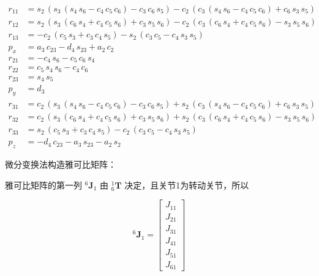 \documentclass{homework}
\begin{document}
\begin{sol}
\begin{align*} 
  r_{11} &= s_{2}\,\left(s_{3}\,\left(s_{4}\,s_{6}-c_{4}\,c_{5}\,c_{6}\right)-c_{3}\,c_{6}\,s_{5}\right)-c_{2}\,\left(c_{3}\,\left(s_{4}\,s_{6}-c_{4}\,c_{5}\,c_{6}\right)+c_{6}\,s_{3}\,s_{5}\right) \\ 
  r_{12} &= s_{2}\,\left(s_{3}\,\left(c_{6}\,s_{4}+c_{4}\,c_{5}\,s_{6}\right)+c_{3}\,s_{5}\,s_{6}\right)-c_{2}\,\left(c_{3}\,\left(c_{6}\,s_{4}+c_{4}\,c_{5}\,s_{6}\right)-s_{3}\,s_{5}\,s_{6}\right) \\ 
  r_{13} &= -c_{2}\,\left(c_{5}\,s_{3}+c_{3}\,c_{4}\,s_{5}\right)-s_{2}\,\left(c_{3}\,c_{5}-c_{4}\,s_{3}\,s_{5}\right) \\ 
  p_x &= a_{3}\,c_{23}-d_{4}\,s_{23}+a_{2}\,c_{2} \\ 
  r_{21} &= -c_{4}\,s_{6}-c_{5}\,c_{6}\,s_{4} \\ 
  r_{22} &= c_{5}\,s_{4}\,s_{6}-c_{4}\,c_{6} \\ 
  r_{23} &= s_{4}\,s_{5} \\ 
  p_y &= d_{3} \\ 
  r_{31} &= c_{2}\,\left(s_{3}\,\left(s_{4}\,s_{6}-c_{4}\,c_{5}\,c_{6}\right)-c_{3}\,c_{6}\,s_{5}\right)+s_{2}\,\left(c_{3}\,\left(s_{4}\,s_{6}-c_{4}\,c_{5}\,c_{6}\right)+c_{6}\,s_{3}\,s_{5}\right) \\ 
  r_{32} &= c_{2}\,\left(s_{3}\,\left(c_{6}\,s_{4}+c_{4}\,c_{5}\,s_{6}\right)+c_{3}\,s_{5}\,s_{6}\right)+s_{2}\,\left(c_{3}\,\left(c_{6}\,s_{4}+c_{4}\,c_{5}\,s_{6}\right)-s_{3}\,s_{5}\,s_{6}\right) \\ 
  r_{33} &= s_{2}\,\left(c_{5}\,s_{3}+c_{3}\,c_{4}\,s_{5}\right)-c_{2}\,\left(c_{3}\,c_{5}-c_{4}\,s_{3}\,s_{5}\right) \\ 
  p_z &= -d_{4}\,c_{23}-a_{3}\,s_{23}-a_{2}\,s_{2}
\end{align*}

微分变换法构造雅可比矩阵：

雅可比矩阵的第一列 $ {^6}\mathbf{J}_1 $ 由 $ _6^1\mathbf{T} $ 决定，且关节1为转动关节，所以

\[
  {^6}\mathbf{J}_1 =
  \begin{bmatrix} 
    J_{11} \\
    J_{21} \\
    J_{31} \\
    J_{41} \\
    J_{51} \\
    J_{61}
  \end{bmatrix}
\]


\end{sol}
\end{document}
